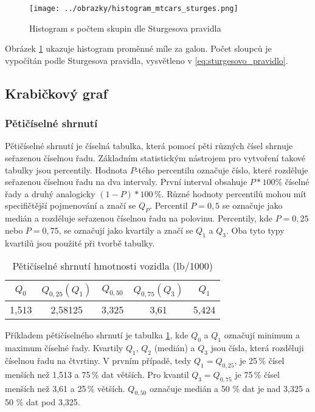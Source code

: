 \begin{figure}[H]
    \centering
    \texttt{[image: ../obrazky/histogram\_mtcars\_sturges.png]}
    \caption{Histogram s počtem skupin dle Sturgesova pravidla} 
    \label{fig:histogram_mtcars_sturges}
\end{figure}

Obrázek \ref{fig:histogram_mtcars_sturges} ukazuje histogram proměnné míle za galon. Počet sloupců je vypočítán podle Sturgesova pravidla,
vysvětleno v \ref{eq:sturgesovo_pravidlo}. 

\subsection{Krabičkový graf}
\subsubsection{Pětičíselné shrnutí}
Pětičíselné shrnutí je číselná tabulka, která pomocí pěti různých čísel shrnuje seřazenou číselnou řadu. Základním statistickým nástrojem pro
vytvoření takové tabulky jsou percentily. Hodnota $P$-tého percentilu označuje číslo, které rozděluje seřazenou číselnou řadu na dva intervaly. 
První interval obsahuje $P*100 \%$ číselné řady a druhý analogicky $(1-P)*100\,\% $. Různé hodnoty percentilů mohou mít specifičtější pojmenování a značí se $Q_P$.
Percentil $P = 0,5$ se označuje jako medián a rozděluje seřazenou číselnou řadu na polovinu. Percentily, kde $P = 0,25$ nebo $P = 0,75$, se označují
jako kvartily a značí se $Q_{1}$ a $Q_{3}$. Oba tyto typy kvartilů jsou použité při tvorbě tabulky.

\begin{table}[H]
    \centering
    \begin{tabular}[t]{c|c|c|c|c}
        \hline
        $Q_{0}     $ & $Q_{0,25} (Q_1) $ & $Q_{0,50}$ & $Q_{0,75} (Q_3)$ & $Q_{1}$\\
        \hline
        1,513 & 2,58125 & 3,325 & 3,61 & 5,424\\
        \hline
    \end{tabular}
    \caption{\label{tab:five-number_summary}Pětičíselné shrnutí hmotnosti vozidla (lb/1000)}
\end{table}


Příkladem pětičíselného shrnutí je tabulka \ref{tab:five-number_summary}, kde $Q_{0}$ a $Q_{1}$ označují minimum a maximum číselné řady. Kvartily $Q_{1}$, $Q_{2}$ (medián)
a $Q_{3}$ jsou čísla, která rozděluji číselnou řadu na čtvrtiny. V prvním případě, tedy $Q_1 = Q_{0,25}$, je 25\,\%  čísel menších než 1,513 a 75\,\%  dat větších. Pro kvantil
$Q_3 = Q_{0,75}$ je 75\,\%  čísel menších než 3,61 a 25\,\%  větších. $Q_{0,50}$ označuje medián a 50 \% dat je nad 3,325 a 50 \% dat pod 3,325.

